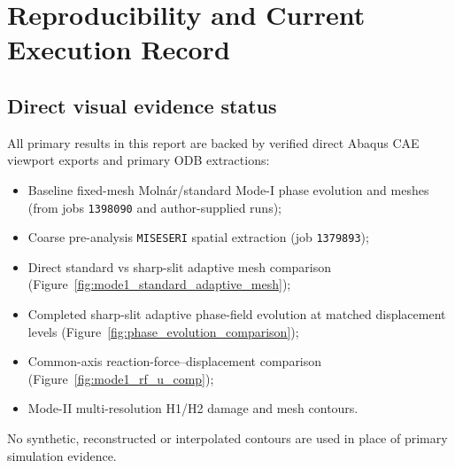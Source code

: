 \appendix
\chapter{Reproducibility and Current Execution Record}
\label{app:repro}
\section{Direct visual evidence status}
All primary results in this report are backed by verified direct Abaqus CAE viewport exports and primary ODB extractions:
\begin{itemize}
  \item Baseline fixed-mesh Moln\'ar/standard Mode-I phase evolution and meshes (from jobs \texttt{1398090} and author-supplied runs);
  \item Coarse pre-analysis \texttt{MISESERI} spatial extraction (job \texttt{1379893});
  \item Direct standard vs sharp-slit adaptive mesh comparison (Figure~\ref{fig:mode1_standard_adaptive_mesh});
  \item Completed sharp-slit adaptive phase-field evolution at matched displacement levels (Figure~\ref{fig:phase_evolution_comparison});
  \item Common-axis reaction-force--displacement comparison (Figure~\ref{fig:mode1_rf_u_comp});
  \item Mode-II multi-resolution H1/H2 damage and mesh contours.
\end{itemize}
No synthetic, reconstructed or interpolated contours are used in place of primary simulation evidence.

